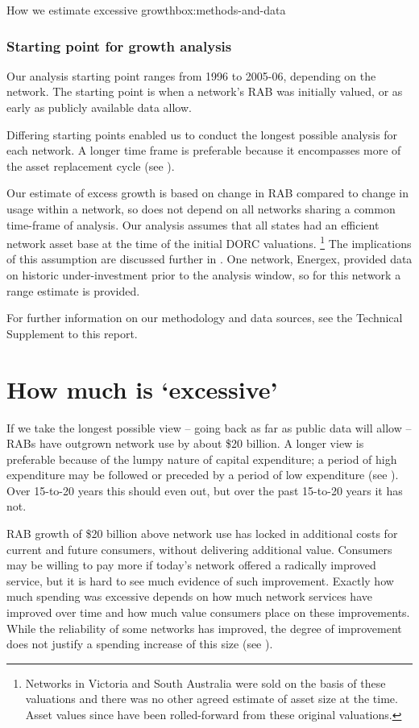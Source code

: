 \documentclass[FrontPage]{grattan}
\begin{document}
\begin{bigbox}{How we estimate excessive growth}{box:methods-and-data}
\subsubsection{Starting point for growth analysis}
Our analysis starting point ranges from 1996 to 2005-06, depending on the network. The starting point is when a network's RAB was initially valued, or as early as publicly available data allow. 

Differing starting points enabled us to conduct the longest possible analysis for each network. A longer time frame is preferable because it encompasses more of the asset replacement cycle (see ). 

Our estimate of excess growth is based on change in RAB compared to change in usage within a network, so does not depend on all networks sharing a common time-frame of analysis. Our analysis assumes that all states had an efficient network asset base at the time of the initial DORC valuations.%
\footnote{Networks in Victoria and South Australia were sold on the basis of these valuations and there was no other agreed estimate of asset size at the time. Asset values since have been rolled-forward from these original valuations.}
The implications of this assumption are discussed further in .
One network, Energex, provided data on historic under-investment prior to the analysis window, so for this network a range estimate is provided.

For further information on our methodology and data sources, see the Technical Supplement to this report.

\end{bigbox}


\section{How much is `excessive'}\label{sec:how-much-is-stranded}
If we take the longest possible view -- going back as far as public data will allow -- RABs have outgrown network use by about \$20 billion. A longer view is preferable because of the lumpy nature of capital expenditure; a period of high expenditure may be followed or preceded by a period of low expenditure (see ). Over 15-to-20 years this should even out, but over the past 15-to-20 years it has not.

RAB growth of \$20 billion above network use has locked in additional costs for current and future consumers, without delivering additional value. Consumers may be willing to pay more if today's network offered a radically improved service, but it is hard to see much evidence of such improvement. Exactly how much spending was excessive depends on how much network services have improved over time and how much value consumers place on these improvements. While the reliability of some networks has improved, the degree of improvement does not justify a spending increase of this size (see ). 
\end{document}
